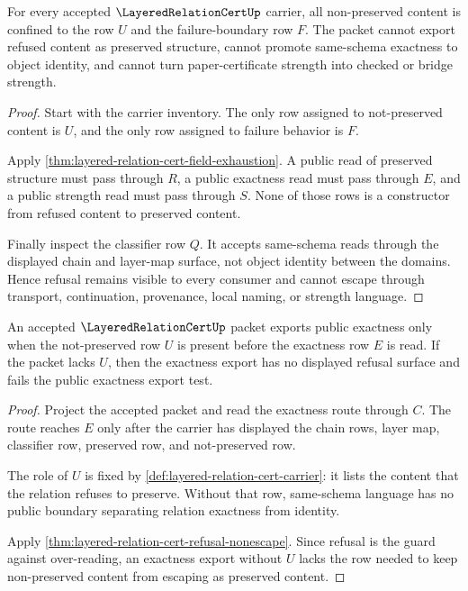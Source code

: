 \begin{theorem}
\label{thm:layered-relation-cert-refusal-nonescape}
For every accepted $\LayeredRelationCertUp$ carrier, all non-preserved content is confined to the row $U$ and the failure-boundary row $F$. The packet cannot export refused content as preserved structure, cannot promote same-schema exactness to object identity, and cannot turn paper-certificate strength into checked or bridge strength.
\end{theorem}
\begin{proof}
Start with the carrier inventory. The only row assigned to not-preserved content is $U$, and the only row assigned to failure behavior is $F$.

Apply \autoref{thm:layered-relation-cert-field-exhaustion}. A public read of preserved structure must pass through $R$, a public exactness read must pass through $E$, and a public strength read must pass through $S$. None of those rows is a constructor from refused content to preserved content.

Finally inspect the classifier row $Q$. It accepts same-schema reads through the displayed chain and layer-map surface, not object identity between the domains. Hence refusal remains visible to every consumer and cannot escape through transport, continuation, provenance, local naming, or strength language.
\end{proof}

\begin{theorem}
\label{thm:layered-relation-cert-public-exactness-test}
An accepted $\LayeredRelationCertUp$ packet exports public exactness only when the not-preserved row $U$ is present before the exactness row $E$ is read. If the packet lacks $U$, then the exactness export has no displayed refusal surface and fails the public exactness export test.
\end{theorem}
\begin{proof}
Project the accepted packet and read the exactness route through $C$. The route reaches $E$ only after the carrier has displayed the chain rows, layer map, classifier row, preserved row, and not-preserved row.

The role of $U$ is fixed by \autoref{def:layered-relation-cert-carrier}: it lists the content that the relation refuses to preserve. Without that row, same-schema language has no public boundary separating relation exactness from identity.

Apply \autoref{thm:layered-relation-cert-refusal-nonescape}. Since refusal is the guard against over-reading, an exactness export without $U$ lacks the row needed to keep non-preserved content from escaping as preserved content.
\end{proof}

